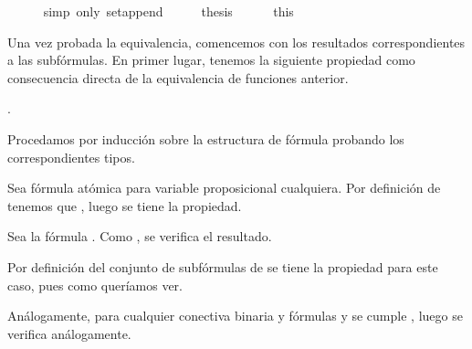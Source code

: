 \begin{isabellebody}
\ \ \ \ \isamarkupfalse%
\ {\isacharparenleft}simp\ only{\isacharcolon}\ set{\isacharunderscore}append{\isacharparenright}\isanewline
\ \ \isamarkupfalse%
\ \isamarkupfalse%
\ {\isacharquery}thesis\isanewline
\ \ \ \ \isamarkupfalse%
\ this\isanewline
{}\isamarkupfalse%
%
\endisatagproof
{\isafoldproof}%
%
\isadelimproof
%
\endisadelimproof
%
\begin{isamarkuptext}%
Una vez probada la equivalencia, comencemos con los resultados 
  correspondientes a las subfórmulas. En primer lugar, tenemos la 
  siguiente propiedad como consecuencia directa de la equivalencia de 
  funciones anterior.

  \begin{lema}
    .
  \end{lema}

  \begin{demostracion}
    Procedamos por inducción sobre la estructura de fórmula probando los 
    correspondientes tipos.
  
    Sea  fórmula atómica para  variable proposicional cualquiera. 
    Por definición de  tenemos que , 
    luego se tiene la propiedad.
  
    Sea la fórmula \isa{{\isasymbottom}}. Como , se verifica el resultado.

    Por definición del conjunto de subfórmulas de  se tiene 
    la propiedad para este caso, pues 
     como queríamos 
    ver.

    Análogamente, para cualquier conectiva binaria \isa{{\isacharasterisk}} y fórmulas  y 
     se cumple , luego se 
    verifica análogamente.
  \end{demostracion}


\end{isamarkuptext}
\end{isabellebody}
